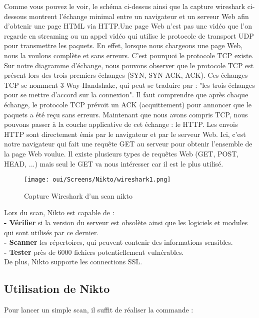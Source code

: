 \newpage
Comme vous pouvez le voir, le schéma ci-dessus ainsi que la capture wireshark ci-dessous montrent l'échange minimal entre un navigateur et un serveur Web afin d'obtenir une page HTML via HTTP.Une page Web n'est pas une vidéo que l'on regarde en streaming ou un appel vidéo qui utilise le protocole de transport UDP pour transmettre les paquets. En effet, lorsque nous chargeons une page Web, nous la voulons complète et sans erreurs. C'est pourquoi le protocole TCP existe. Sur notre diagramme d'échange, nous pouvons observer que le protocole TCP est présent lors des trois premiers échanges (SYN, SYN ACK, ACK). Ces échanges TCP se nomment 3-Way-Handshake, qui peut se traduire par : "les trois échanges pour se mettre d'accord sur la connexion". Il faut comprendre que après chaque échange, le protocole TCP prévoit un ACK (acquittement) pour annoncer que le paquets a été reçu sans erreurs. Maintenant que nous avons compris TCP, nous pouvons passer à la couche applicative de cet échange : le HTTP. Les envois HTTP sont directement émis par le navigateur et par le serveur Web. Ici, c'est notre navigateur qui fait une requête GET au serveur pour obtenir l'ensemble de la page Web voulue. Il existe plusieurs types de requêtes Web (GET, POST, HEAD, ...) mais seul le GET va nous intéresser car il est le plus utilisé. 

\begin{figure}[htp!]
  \centering
  \setlength\figureheight{7cm}
  \setlength\figurewidth{9cm}
  \texttt{[image: oui/Screens/Nikto/wireshark1.png]}
  \caption{Capture Wireshark d'un scan nikto}
  \label{fig:courbe-tikz}
\end{figure}

\newpage
Lors du scan, Nikto est capable de :\\
\textbf{- Vérifier}     si la version du serveur est obsolète ainsi que les logiciels et     modules qui sont utilisés par ce dernier. \\   
\textbf{- Scanner}     les répertoires, qui peuvent contenir des informations sensibles.\\
\textbf{- Tester}     près de 6000 fichiers potentiellement vulnérables.\\
De plus, Nikto supporte les connections SSL.

\subsection{Utilisation de Nikto}
Pour lancer un simple scan, il suffit de réaliser la commande :

